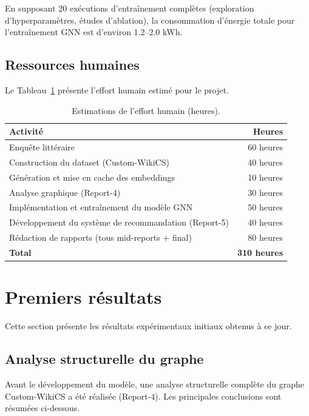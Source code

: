 En supposant 20 exécutions d'entraînement complètes (exploration d'hyperparamètres, études d'ablation), la consommation d'énergie totale pour l'entraînement GNN est d'environ 1.2--2.0 kWh.

\subsection{Ressources humaines}

Le Tableau~\ref{tab:human-resources} présente l'effort humain estimé pour le projet.

\begin{table}[htbp]
\centering
\caption{Estimations de l'effort humain (heures).}
\label{tab:human-resources}
\begin{tabular}{lr}
\toprule
\textbf{Activité} & \textbf{Heures} \\
\midrule
Enquête littéraire & 60 heures \\
Construction du dataset (Custom-WikiCS) & 40 heures \\
Génération et mise en cache des embeddings & 10 heures \\
Analyse graphique (Report-4) & 30 heures \\
Implémentation et entraînement du modèle GNN & 50 heures \\
Développement du système de recommandation (Report-5) & 40 heures \\
Rédaction de rapports (tous mid-reports + final) & 80 heures \\
\midrule
\textbf{Total} & \textbf{310 heures} \\
\bottomrule
\end{tabular}
\end{table}

\section{Premiers résultats}

Cette section présente les résultats expérimentaux initiaux obtenus à ce jour.

\subsection{Analyse structurelle du graphe}

Avant le développement du modèle, une analyse structurelle complète du graphe Custom-WikiCS a été réalisée (Report-4). Les principales conclusions sont résumées ci-dessous.

